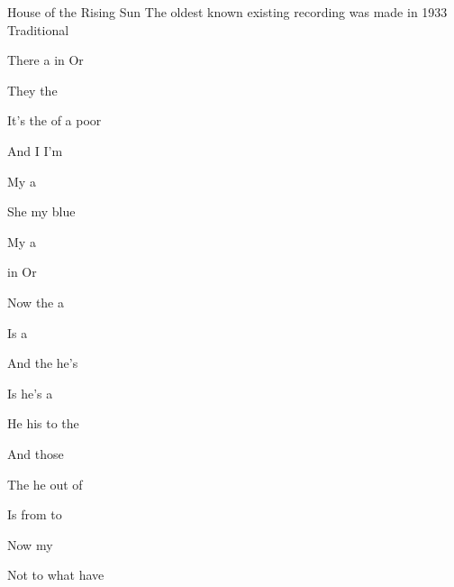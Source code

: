 \begin{SBSong}{House of the Rising Sun}  
  {The oldest known existing recording was made in 1933}
  {Traditional}
  \begin{SBVerse}
    There  a  in  Or
    
    They  the   
    
    It's  the  of  a poor 
    
    And  I  I'm  
  \end{SBVerse}
  \begin{SBVerse}
    My   a  
    
    She  my  blue  
    
    My   a  
    
     in  Or 
  \end{SBVerse}
  \WBPageBrk
  \begin{SBVerse}
    Now the   a  
    
    Is a    
    
    And the   he's 
    
    Is  he's  a  
  \end{SBVerse}
  \begin{SBVerse}
    He  his   to the 
    
    And  those   
    
    The   he  out of 
    
    Is  from  to  
  \end{SBVerse}
  \begin{SBVerse}
    Now  my   
    
    Not to  what  have  
    

\end{SBVerse}
\end{SBSong}
